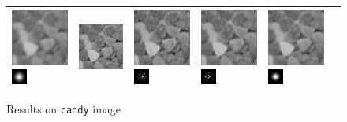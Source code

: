 \begin{figure}
\begin{tabular}{|l|l|l|l|l|l|}
 \hline\includegraphics[width=2.5cm]{results/candy_kernelgauss_blurred.png}
\includegraphics[width=0.5cm]{images/kernelgauss}
& \includegraphics[width=2.5cm]{results/candy_kernelgauss_nonblind_deconv.png}
&\includegraphics[width=2.5cm]{results/candy_kernelgauss_MAPxk_x.png}
\includegraphics[width=0.5cm]{results/candy_kernelgauss_MAPxk_k.png}
&\includegraphics[width=2.5cm]{results/candy_kernelgauss_MAPk_x.png}
\includegraphics[width=0.5cm]{results/candy_kernelgauss_MAPk_k.png}
&\includegraphics[width=2.5cm]{results/candy_kernelgauss_MAPkreg_x.png}
\includegraphics[width=0.5cm]{results/candy_kernelgauss_MAPkreg_k.png}
\\ 
 \hline\end{tabular} 

    \caption{Results on \texttt{candy} image}\label{fig:results_candy}
    \end{figure}
